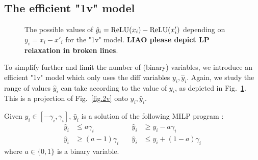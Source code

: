 	\subsection{The efficient "1v" model}

		\begin{figure}[t!]
		\centering
	\hspace*{10ex}
\caption{The possible values of $\hat{y}_i=\mathrm{ReLU}(x_i)-\mathrm{ReLU}(x'_i)$ depending on $y_i = x_i-x'_i$ for the "1v" model. {\bf LIAO please depict LP relaxation in broken lines}.
    }
	\label{fig.1v}
\end{figure}



	To simplify further and limit the number of (binary) variables, 
    we introduce an efficient "1v" model which only uses the diff variables $y_i,\hat{y}_i$. Again, we study the range of values $\hat{y}_i$ can take according to the value of $y_i$, as depicted in Fig.~\ref{fig.1v}. This is a projection of Fig.~\ref{fig.2v} onto $y_i,\hat{y}_i$.
    


    \begin{proposition}
    \label{prop3}
    Given $y_i \in [-\gamma_i,\gamma_i]$, 
    $\hat{y}_i$ is a solution of the following MILP program :\begin{align*}
		\hat{y}_i &\leq a \gamma_i               &\quad \hat{y}_i &\geq y_i - a \gamma_i \\
		\hat{y}_i &\geq (a-1) \gamma_i           &\quad \hat{y}_i &\leq y_i + (1-a) \gamma_i
	\end{align*} where $a \in \{0,1\}$ is a binary variable.
	\end{proposition}

